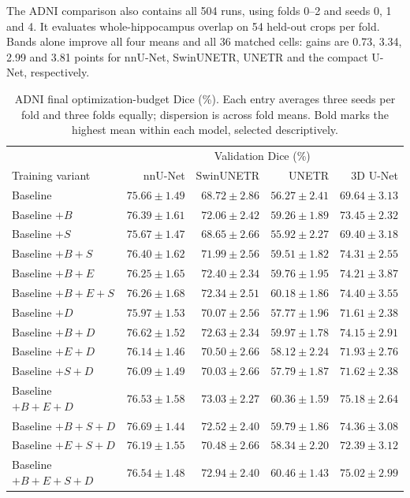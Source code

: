 \documentclass[12pt,a4paper]{article}
\begin{document}
The ADNI comparison also contains all 504 runs, using folds 0--2 and
seeds 0, 1 and 4. It evaluates whole-hippocampus overlap on 54 held-out
crops per fold. Bands alone improve all four means and all 36 matched
cells: gains are 0.73, 3.34, 2.99 and 3.81 points for nnU-Net,
SwinUNETR, UNETR and the compact U-Net, respectively.
\begin{table}[htbp]
\centering\small{}
\setlength{\tabcolsep}{5pt}
\renewcommand{\arraystretch}{1.15}
\begin{tabular}{@{}lrrrr@{}}
\hline
 & \multicolumn{4}{c}{Validation Dice (\%)} \\
Training variant & nnU-Net & SwinUNETR & UNETR & 3D U-Net \\
\hline
Baseline & $75.66\pm1.49$ & $68.72\pm2.86$ & $56.27\pm2.41$ & $69.64\pm3.13$ \\
Baseline $+B$ & $76.39\pm1.61$ & $72.06\pm2.42$ & $59.26\pm1.89$ & $73.45\pm2.32$ \\
Baseline $+S$ & $75.67\pm1.47$ & $68.65\pm2.66$ & $55.92\pm2.27$ & $69.40\pm3.18$ \\
Baseline $+B+S$ & $76.40\pm1.62$ & $71.99\pm2.56$ & $59.51\pm1.82$ & $74.31\pm2.55$ \\
Baseline $+B+E$ & $76.25\pm1.65$ & $72.40\pm2.34$ & $59.76\pm1.95$ & $74.21\pm3.87$ \\
Baseline $+B+E+S$ & $76.26\pm1.68$ & $72.34\pm2.51$ & $60.18\pm1.86$ & $74.40\pm3.55$ \\
Baseline $+D$ & $75.97\pm1.53$ & $70.07\pm2.56$ & $57.77\pm1.96$ & $71.61\pm2.38$ \\
Baseline $+B+D$ & $76.62\pm1.52$ & $72.63\pm2.34$ & $59.97\pm1.78$ & $74.15\pm2.91$ \\
Baseline $+E+D$ & $76.14\pm1.46$ & $70.50\pm2.66$ & $58.12\pm2.24$ & $71.93\pm2.76$ \\
Baseline $+S+D$ & $76.09\pm1.49$ & $70.03\pm2.66$ & $57.79\pm1.87$ & $71.62\pm2.38$ \\
Baseline $+B+E+D$ & $76.53\pm1.58$ & $\mathbf{73.03\pm2.27}$ & $60.36\pm1.59$ & $\mathbf{75.18\pm2.64}$ \\
Baseline $+B+S+D$ & $\mathbf{76.69\pm1.44}$ & $72.52\pm2.40$ & $59.79\pm1.86$ & $74.36\pm3.08$ \\
Baseline $+E+S+D$ & $76.19\pm1.55$ & $70.48\pm2.66$ & $58.34\pm2.20$ & $72.39\pm3.12$ \\
Baseline $+B+E+S+D$ & $76.54\pm1.48$ & $72.94\pm2.40$ & $\mathbf{60.46\pm1.43}$ & $75.02\pm2.99$ \\
\hline
\end{tabular}
\caption{ADNI final optimization-budget Dice (\%). Each entry averages three seeds per fold and three folds equally; dispersion is across fold means. Bold marks the highest mean within each model, selected descriptively.}
\label{tab:adni-noaug-matrix}
\end{table}
\end{document}
